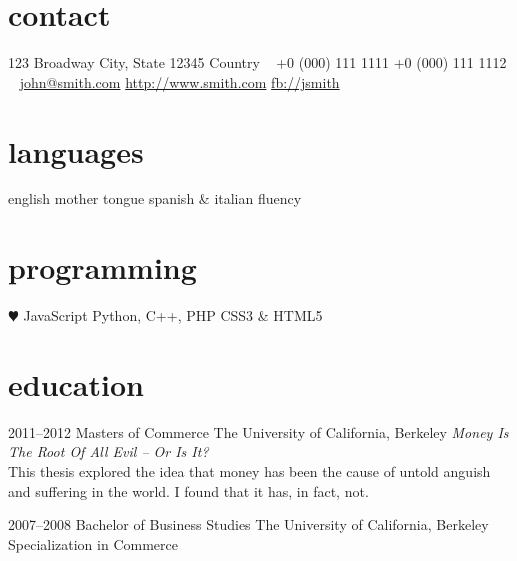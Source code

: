 \documentclass[]{friggeri-cv-a4}
\begin{document}


\begin{aside} %
\section{contact}
123 Broadway
City, State 12345
Country
~
+0 (000) 111 1111
+0 (000) 111 1112
~
\href{mailto:john@smith.com}{john@smith.com}
\href{http://www.smith.com}{http://www.smith.com}
\href{http://facebook.com/johnsmith}{fb://jsmith}
\section{languages}
english mother tongue
spanish \& italian fluency
\section{programming}
{\color{red} $\varheartsuit$} JavaScript
Python, C++, PHP
CSS3 \& HTML5
\end{aside}


\section{education}

\begin{entrylist}


\entry
{2011--2012}
{Masters {\normalfont of Commerce}}
{The University of California, Berkeley}
{\emph{Money Is The Root Of All Evil -- Or Is It?} \\ This thesis explored the idea that money has been the cause of untold anguish and suffering in the world. I found that it has, in fact, not.}


\entry
{2007--2008}
{Bachelor {\normalfont of Business Studies}}
{The University of California, Berkeley}
{Specialization in Commerce}


\end{entrylist}
\end{document}

